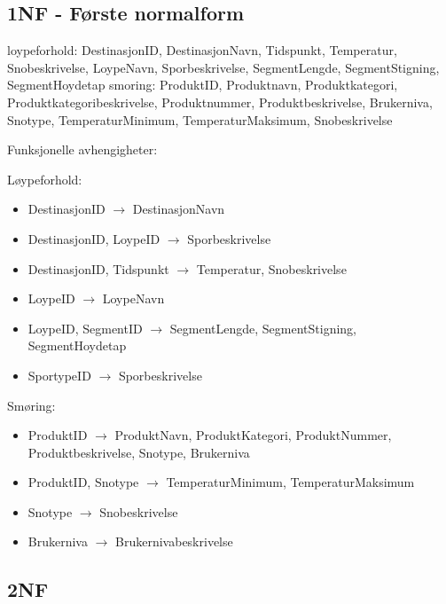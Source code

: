 \documentclass[12pt, a4paper]{article}
\begin{document}
\subsection{1NF - Første normalform}

loypeforhold: DestinasjonID, DestinasjonNavn, Tidspunkt, Temperatur, Snobeskrivelse, LoypeNavn, Sporbeskrivelse, SegmentLengde, SegmentStigning, SegmentHoydetap
smoring: ProduktID, Produktnavn, Produktkategori, Produktkategoribeskrivelse, Produktnummer, Produktbeskrivelse, Brukerniva, Snotype, TemperaturMinimum, TemperaturMaksimum, Snobeskrivelse

Funksjonelle avhengigheter:

Løypeforhold:

\begin{itemize}
	\item DestinasjonID $\rightarrow$ DestinasjonNavn 
	\item DestinasjonID, LoypeID $\rightarrow$ Sporbeskrivelse 
	\item DestinasjonID, Tidspunkt $\rightarrow$ Temperatur, Snobeskrivelse
	\item LoypeID $\rightarrow$ LoypeNavn
	\item LoypeID, SegmentID $\rightarrow$ SegmentLengde, SegmentStigning, SegmentHoydetap 
	\item SportypeID $\rightarrow$ Sporbeskrivelse 
\end{itemize}

Smøring:

\begin{itemize}
	\item ProduktID $\rightarrow$ ProduktNavn, ProduktKategori, ProduktNummer, Produktbeskrivelse, Snotype, Brukerniva
	\item ProduktID, Snotype $\rightarrow$ TemperaturMinimum, TemperaturMaksimum 
	\item Snotype $\rightarrow$ Snobeskrivelse 
	\item Brukerniva $\rightarrow$ Brukernivabeskrivelse
\end{itemize}

\subsection{2NF}
\end{document}
